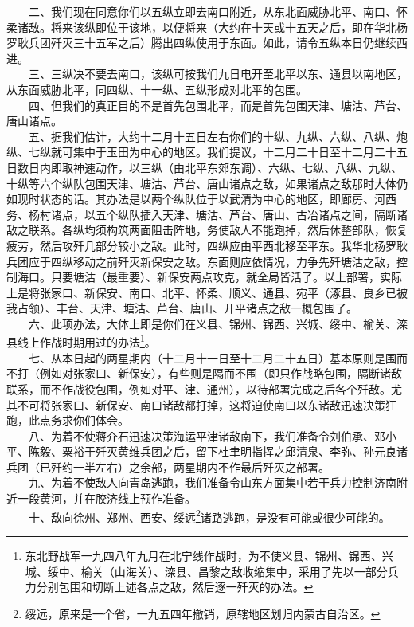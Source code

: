 \documentclass[cn,11pt,chinese]{elegantbook}
\begin{document}
　　二、我们现在同意你们以五纵立即去南口附近，从东北面威胁北平、南口、怀柔诸敌。将来该纵即位于该地，以便将来（大约在十天或十五天之后，即在华北杨罗耿兵团歼灭三十五军之后）腾出四纵使用于东面。如此，请令五纵本日仍继续西进。\\
　　三、三纵决不要去南口，该纵可按我们九日电开至北平以东、通县以南地区，从东面威胁北平，同四纵、十一纵、五纵形成对北平的包围。\\
　　四、但我们的真正目的不是首先包围北平，而是首先包围天津、塘沽、芦台、唐山诸点。\\
　　五、据我们估计，大约十二月十五日左右你们的十纵、九纵、六纵、八纵、炮纵、七纵就可集中于玉田为中心的地区。我们提议，十二月二十日至十二月二十五日数日内即取神速动作，以三纵（由北平东郊东调）、六纵、七纵、八纵、九纵、十纵等六个纵队包围天津、塘沽、芦台、唐山诸点之敌，如果诸点之敌那时大体仍如现时状态的话。其办法是以两个纵队位于以武清为中心的地区，即廊房、河西务、杨村诸点，以五个纵队插入天津、塘沽、芦台、唐山、古冶诸点之间，隔断诸敌之联系。各纵均须构筑两面阻击阵地，务使敌人不能跑掉，然后休整部队，恢复疲劳，然后攻歼几部分较小之敌。此时，四纵应由平西北移至平东。我华北杨罗耿兵团应于四纵移动之前歼灭新保安之敌。东面则应依情况，力争先歼塘沽之敌，控制海口。只要塘沽（最重要）、新保安两点攻克，就全局皆活了。以上部署，实际上是将张家口、新保安、南口、北平、怀柔、顺义、通县、宛平（涿县、良乡已被我占领）、丰台、天津、塘沽、芦台、唐山、开平诸点之敌一概包围了。\\
　　六、此项办法，大体上即是你们在义县、锦州、锦西、兴城、绥中、榆关、滦县线上作战时期用过的办法\footnote[4]{ 东北野战军一九四八年九月在北宁线作战时，为不使义县、锦州、锦西、兴城、绥中、榆关（山海关）、滦县、昌黎之敌收缩集中，采用了先以一部分兵力分别包围和切断上述各点之敌，然后逐一歼灭的办法。}。\\
　　七、从本日起的两星期内（十二月十一日至十二月二十五日）基本原则是围而不打（例如对张家口、新保安），有些则是隔而不围（即只作战略包围，隔断诸敌联系，而不作战役包围，例如对平、津、通州），以待部署完成之后各个歼敌。尤其不可将张家口、新保安、南口诸敌都打掉，这将迫使南口以东诸敌迅速决策狂跑，此点务求你们体会。\\
　　八、为着不使蒋介石迅速决策海运平津诸敌南下，我们准备令刘伯承、邓小平、陈毅、粟裕于歼灭黄维兵团之后，留下杜聿明指挥之邱清泉、李弥、孙元良诸兵团（已歼约一半左右）之余部，两星期内不作最后歼灭之部署。\\
　　九、为着不使敌人向青岛逃跑，我们准备令山东方面集中若干兵力控制济南附近一段黄河，并在胶济线上预作准备。\\
　　十、敌向徐州、郑州、西安、绥远\footnote[5]{ 绥远，原来是一个省，一九五四年撤销，原辖地区划归内蒙古自治区。}诸路逃跑，是没有可能或很少可能的。\\
\end{document}
